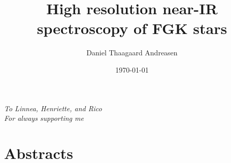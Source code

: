 \documentclass[a4paper,
11pt,
twoside,
]{memoir}
\begin{document}
    \title{High resolution near-IR spectroscopy of FGK stars}
    \author{Daniel Thaagaard Andreasen}
    \date{\today}
    \maketitle
\frontmatter
%


\cleardoublepage
\thispagestyle{empty}

\begin{adjustwidth}{3em}{4em}
   \centering \huge \itshape
   To Linnea, Henriette, and Rico\\For always supporting me
\end{adjustwidth}
\cleardoublepage

\tableofcontents  %
\thispagestyle{empty}

\newpage
\chapter*{Abstracts}
\newpage
\listoffigures
\listoftables
\mainmatter







\thispagestyle{empty}


%    


\backmatter


\nocite{} %
\end{document}
